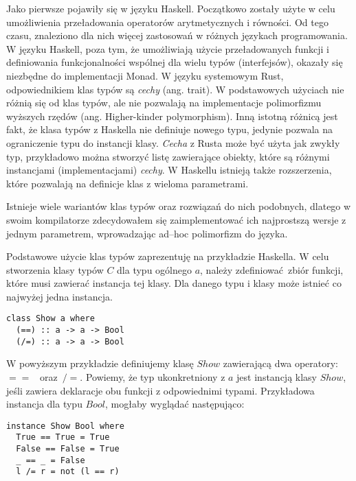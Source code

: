\documentclass[declaration,shortabstract]{iithesis}
\begin{document}
Jako pierwsze pojawiły się w języku Haskell. Początkowo zostały użyte w celu 
umożliwienia przeładowania operatorów arytmetycznych i równości. Od tego czasu, 
znaleziono dla nich więcej zastosowań w różnych językach programowania. W języku
Haskell, poza tym, że umożliwiają użycie przeładowanych funkcji i definiowania 
funkcjonalności wspólnej dla wielu typów (interfejsów), okazały się niezbędne 
do implementacji Monad. W języku systemowym Rust, odpowiednikiem klas typów są
\textit{cechy} (ang. trait). W podstawowych użyciach nie różnią się od klas typów, ale 
nie pozwalają na implementacje polimorfizmu wyższych rzędów \cite{no_hkt_in_rust} (ang. 
Higher-kinder polymorphism). Inną istotną różnicą jest fakt, że klasa typów z 
Haskella nie definiuje nowego typu, jedynie pozwala na ograniczenie typu do 
instancji klasy. \textit{Cecha} z Rusta może być użyta jak zwykły typ, przykładowo 
można stworzyć listę zawierające obiekty, które są różnymi instancjami 
(implementacjami) \textit{cechy}. W Haskellu istnieją także rozszerzenia, które 
pozwalają na definicje klas z wieloma parametrami. 


Istnieje wiele wariantów klas typów oraz rozwiązań do nich podobnych, dlatego w swoim 
kompilatorze zdecydowałem się zaimplementować ich najprostszą wersje z jednym 
parametrem, wprowadzając ad--hoc polimorfizm do języka.

Podstawowe użycie klas typów zaprezentuję na przykładzie Haskella. 
W celu stworzenia klasy typów $C$ dla typu ogólnego $a$, należy 
zdefiniować zbiór funkcji, które musi zawierać instancja tej klasy. Dla danego 
typu i klasy może istnieć co najwyżej jedna instancja. 

\begin{lstlisting}[frame=single, caption=Przykładowa definicja klasy typów.]
class Show a where
  (==) :: a -> a -> Bool
  (/=) :: a -> a -> Bool
\end{lstlisting}

W powyższym przykładzie definiujemy klasę $Show$ zawierającą dwa operatory:~$==$ 
~oraz~$/=$. Powiemy, że typ ukonkretniony z $a$ jest instancją klasy $Show$, 
jeśli zawiera deklaracje obu funkcji z odpowiednimi typami. Przykładowa 
instancja dla typu $Bool$, mogłaby wyglądać następująco:

\begin{lstlisting}[frame=single, caption=Instancja klasy $Show$ dla typu $Bool$.]
instance Show Bool where
  True == True = True 
  False == False = True 
  _ == _ = False
  l /= r = not (l == r)
\end{lstlisting}
\end{document}
